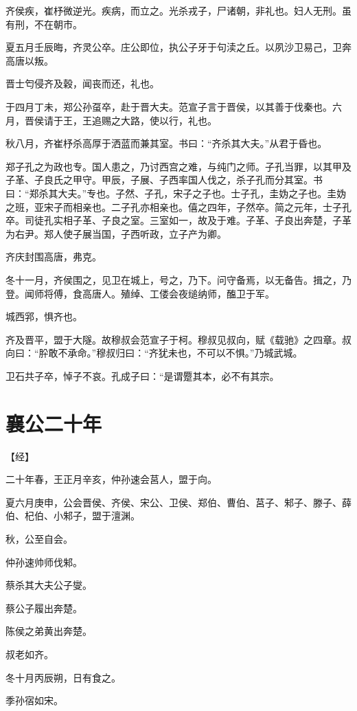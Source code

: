 \documentclass[a4paper,12pt,UTF8,twoside]{ctexbook}
\begin{document}
齐侯疾，崔杼微逆光。疾病，而立之。光杀戎子，尸诸朝，非礼也。妇人无刑。虽有刑，不在朝市。

夏五月壬辰晦，齐灵公卒。庄公即位，执公子牙于句渎之丘。以夙沙卫易己，卫奔高唐以叛。

晋士匄侵齐及穀，闻丧而还，礼也。

于四月丁未，郑公孙虿卒，赴于晋大夫。范宣子言于晋侯，以其善于伐秦也。六月，晋侯请于王，王追赐之大路，使以行，礼也。

秋八月，齐崔杼杀高厚于洒蓝而兼其室。书曰：“齐杀其大夫。”从君于昏也。

郑子孔之为政也专。国人患之，乃讨西宫之难，与纯门之师。子孔当罪，以其甲及子革、子良氏之甲守。甲辰，子展、子西率国人伐之，杀子孔而分其室。书曰：“郑杀其大夫。”专也。子然、子孔，宋子之子也。士子孔，圭妫之子也。圭妫之班，亚宋子而相亲也。二子孔亦相亲也。僖之四年，子然卒。简之元年，士子孔卒。司徒孔实相子革、子良之室。三室如一，故及于难。子革、子良出奔楚，子革为右尹。郑人使子展当国，子西听政，立子产为卿。

齐庆封围高唐，弗克。

冬十一月，齐侯围之，见卫在城上，号之，乃下。问守备焉，以无备告。揖之，乃登。闻师将傅，食高唐人。殖绰、工偻会夜缒纳师，醢卫于军。

城西郛，惧齐也。

齐及晋平，盟于大隧。故穆叔会范宣子于柯。穆叔见叔向，赋《载驰》之四章。叔向曰：“肸敢不承命。”穆叔归曰：“齐犹未也，不可以不惧。”乃城武城。

卫石共子卒，悼子不哀。孔成子曰：“是谓蹷其本，必不有其宗。

\section{襄公二十年}



【经】

二十年春，王正月辛亥，仲孙速会莒人，盟于向。

夏六月庚申，公会晋侯、齐侯、宋公、卫侯、郑伯、曹伯、莒子、邾子、滕子、薛伯、杞伯、小邾子，盟于澶渊。

秋，公至自会。

仲孙速帅师伐邾。

蔡杀其大夫公子燮。

蔡公子履出奔楚。

陈侯之弟黄出奔楚。

叔老如齐。

冬十月丙辰朔，日有食之。

季孙宿如宋。
\end{document}
